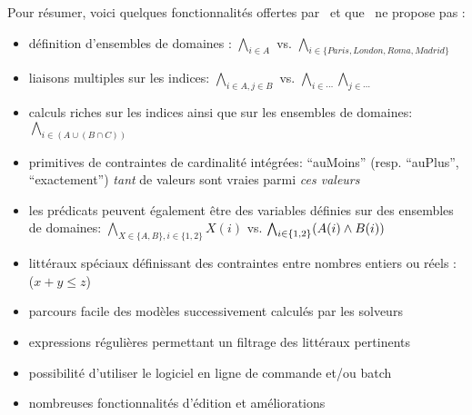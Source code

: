 Pour résumer, voici quelques fonctionnalités offertes par \touist\ et que \satoulouse\ ne propose pas :
\begin{itemize}
\item définition d'ensembles de domaines : $\bigwedge_{i\in A}$ vs. $\bigwedge_{i\in\{Paris,London,Roma,Madrid\}}$
\item liaisons multiples sur les indices: $\bigwedge_{i\in A,j\in B}$ vs. $\bigwedge_{i\in \cdots} \bigwedge_{j\in \cdots}$
\item calculs riches sur les indices ainsi que sur les ensembles de domaines: $\bigwedge_{i\in (A\cup (B \cap C))}$
\item primitives de contraintes de cardinalité intégrées: ``auMoins'' (resp. ``auPlus'', ``exactement'') \emph{tant} de valeurs sont vraies parmi \emph{ces valeurs}
\item les prédicats peuvent également être des variables définies sur des ensembles de domaines: $\bigwedge_{X\in \{A,B\},i\in \{1,2\}} X(i)$ vs. $\bigwedge_{i\in \{1,2\}} (A(i)\wedge B(i))$
\item littéraux spéciaux définissant des contraintes entre nombres entiers ou réels : ($x+y\leq z$)
\item parcours facile des modèles successivement calculés par les solveurs
\item expressions régulières permettant un filtrage des littéraux pertinents
\item possibilité d'utiliser le logiciel en ligne de commande et/ou batch
\item nombreuses fonctionnalités d'édition et améliorations
\end{itemize}
